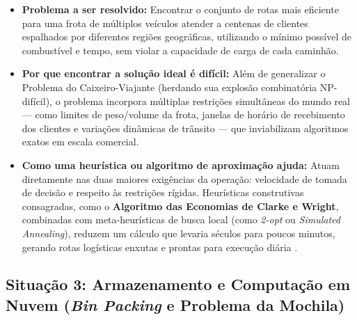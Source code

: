 \begin{itemize}
    \item \textbf{Problema a ser resolvido:} Encontrar o conjunto de rotas mais eficiente para uma frota de múltiplos veículos atender a centenas de clientes espalhados por diferentes regiões geográficas, utilizando o mínimo possível de combustível e tempo, sem violar a capacidade de carga de cada caminhão.
    \item \textbf{Por que encontrar a solução ideal é difícil:} Além de generalizar o Problema do Caixeiro-Viajante (herdando sua explosão combinatória NP-difícil), o problema incorpora múltiplas restrições simultâneas do mundo real --- como limites de peso/volume da frota, janelas de horário de recebimento dos clientes e variações dinâmicas de trânsito --- que inviabilizam algoritmos exatos em escala comercial.
    \item \textbf{Como uma heurística ou algoritmo de aproximação ajuda:} Atuam diretamente nas duas maiores exigências da operação: velocidade de tomada de decisão e respeito às restrições rígidas. Heurísticas construtivas consagradas, como o \textbf{Algoritmo das Economias de Clarke e Wright}, combinadas com meta-heurísticas de busca local (como \textit{2-opt} ou \textit{Simulated Annealing}), reduzem um cálculo que levaria séculos para poucos minutos, gerando rotas logísticas enxutas e prontas para execução diária \cite{goldbarg2005, parpinelli_udesc}.
\end{itemize}

\subsection{Situação 3: Armazenamento e Computação em Nuvem (\textit{Bin Packing} e Problema da Mochila)}

